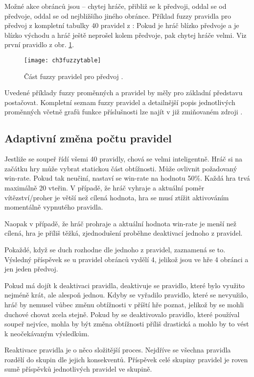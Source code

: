 Možné akce obránců jsou – chytej hráče, přibliž se k předvoji, oddal se od předvoje, oddal se od nejbližšího jiného obránce.
Příklad fuzzy pravidla pro předvoj z kompletní tabulky 40 pravidel z \cite{25deadend} :
Pokud je hráč blízko předvoje a je blízko východu a hráč ještě neprošel kolem předvoje, pak chytej hráče velmi. Viz první pravidlo z obr. \ref{fig-ch3fuzzytable}.

\begin{figure}
  \centering
  \texttt{[image: ch3fuzzytable]}
	\caption{Část fuzzy pravidel pro předvoj \cite{25deadend}. }
	\label{fig-ch3fuzzytable}
\end{figure}

Uvedené příklady fuzzy proměnných a pravidel by měly pro základní představu postačovat. Kompletní seznam fuzzy pravidel a detailnější popis jednotlivých proměnných včetně grafů funkce příslušnosti lze najít v již zmiňovaném zdroji \cite{25deadend}.

\subsection{Adaptivní změna počtu pravidel}

Jestliže se soupeř řídí všemi 40 pravidly, chová se velmi inteligentně. Hráč si na začátku hry může vybrat statickou část obtížnosti. Může ovlivnit požadovaný win-rate. Pokud tak neučiní, nastaví se win-rate na hodnotu 50\%. Každá hra trvá maximálně 20 vteřin. V případě, že hráč vyhraje a aktuální poměr vítězství/proher  je větší než cílená hodnota, hra se musí ztížit aktivováním momentálně vypnutého pravidla.

Naopak v případě, že hráč prohraje a aktuální hodnota win-rate je menší než cílená, hra je příliš těžká, zjednodušení proběhne deaktivací jednoho z pravidel.

Pokaždé, když se duch rozhodne dle jednoho z pravidel, zaznamená se to. Výsledný příspěvek se u pravidel obránců vydělí 4, jelikož jsou ve hře 4 obránci a jen jeden předvoj.

Pokud má dojít k deaktivaci pravidla, deaktivuje se pravidlo, které bylo využito nejméně krát, ale alespoň jednou. Kdyby se vyřadilo pravidlo, které se nevyužilo, hráč by nemusel vůbec změnu obtížnosti v příští hře poznat, jelikož by se mohli duchové chovat zcela stejně. Pokud by se deaktivovalo pravidlo, které používal soupeř nejvíce, mohla by být změna obtížnosti příliš drastická a mohlo by to vést k neočekávaným výsledkům.

Reaktivace pravidla je o něco složitější proces. Nejdříve se všechna pravidla rozdělí do skupin dle jejich konsekventů. Příspěvek celé skupiny pravidel je roven sumě příspěvků jednotlivých pravidel ve skupině. 

